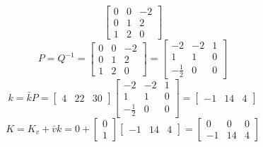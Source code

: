 \begin{enumerate}
\begin{enumerate}
\begin{equation}
\begin{bmatrix}
          0 & 0 & -2 \\
          0 & 1 & 2 \\
          1 & 2 & 0
        \end{bmatrix}
      \end{equation}
      \begin{equation}
       P = Q^{-1} =
        \begin{bmatrix}
          0 & 0 & -2 \\
          0 & 1 & 2 \\
          1 & 2 & 0
        \end{bmatrix} =
        \begin{bmatrix}
          -2 & -2 & 1\\
          1 & 1 & 0 \\
          -\frac 1 2 & 0 & 0
        \end{bmatrix}
      \end{equation}
      \begin{equation}
        k = \bar k P = 
        \begin{bmatrix}
          4 & 22 & 30
        \end{bmatrix}
        \begin{bmatrix}
          -2 & -2 & 1\\
          1 & 1 & 0 \\
          -\frac 1 2 & 0 & 0
        \end{bmatrix} = 
        \begin{bmatrix}
          -1 & 14 & 4
        \end{bmatrix}
      \end{equation}
      \begin{equation}
        K =
        K_v +
        \bar v k =
        0 +
        \begin{bmatrix}
          0 \\
          1
        \end{bmatrix}
        \begin{bmatrix}
          -1 & 14 & 4
        \end{bmatrix} =
        \begin{bmatrix}
          0 & 0 & 0 \\
          -1 & 14 & 4
        \end{bmatrix}
      \end{equation}
    \end{enumerate}
  \end{enumerate}    